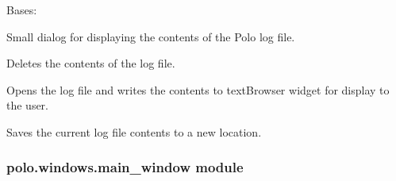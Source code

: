 \documentclass[letterpaper,10pt,english]{sphinxmanual}
\begin{document}
\begin{fulllineitems}
\label{\detokenize{polo.windows:polo.windows.log_dialog.LogDialog}}
Bases: 

Small dialog for displaying the contents of the Polo log file.

\begin{fulllineitems}
\label{\detokenize{polo.windows:polo.windows.log_dialog.LogDialog.clear_log}}
Deletes the contents of the log file.

\end{fulllineitems}


\begin{fulllineitems}
\label{\detokenize{polo.windows:polo.windows.log_dialog.LogDialog.display_log_text}}
Opens the log file and writes the contents to textBrowser widget
for display to the user.

\end{fulllineitems}


\begin{fulllineitems}
\label{\detokenize{polo.windows:polo.windows.log_dialog.LogDialog.save_log_file}}
Saves the current log file contents to a new location.

\end{fulllineitems}


\end{fulllineitems}



\subsubsection{polo.windows.main\_window module}
\label{\detokenize{polo.windows:module-polo.windows.main_window}}\label{\detokenize{polo.windows:polo-windows-main-window-module}}
\end{document}
